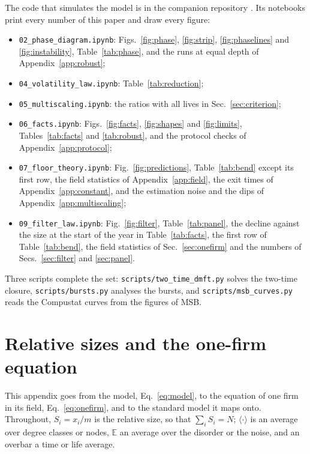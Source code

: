\documentclass[pre,twocolumn,superscriptaddress,nofootinbib]{revtex4-2}
\newcommand{\E}{\mathbb E}
\begin{document}
The code that simulates the model is in the companion repository \cite{code}.  Its notebooks print every
number of this paper and draw every figure:
\begin{itemize}
\item \texttt{02\_phase\_diagram.ipynb}: Figs.~\ref{fig:phase}, \ref{fig:strip}, \ref{fig:phaselines} and
  \ref{fig:instability}, Table~\ref{tab:phase}, and the runs at equal depth of Appendix~\ref{app:robust};
\item \texttt{04\_volatility\_law.ipynb}: Table~\ref{tab:reduction};
\item \texttt{05\_multiscaling.ipynb}: the ratios with all lives in Sec.~\ref{sec:criterion};
\item \texttt{06\_facts.ipynb}: Figs.~\ref{fig:facts}, \ref{fig:shapes} and \ref{fig:limits}, Tables~\ref{tab:facts} and \ref{tab:robust}, and the protocol checks of Appendix~\ref{app:protocol};
\item \texttt{07\_floor\_theory.ipynb}: Fig.~\ref{fig:predictions}, Table~\ref{tab:bend} except its first row, the field statistics of Appendix~\ref{app:field}, the exit times of
  Appendix~\ref{app:constant}, and the estimation noise and the dips of Appendix~\ref{app:multiscaling};
\item \texttt{09\_filter\_law.ipynb}: Fig.~\ref{fig:filter}, Table~\ref{tab:panel}, the decline against the size at
  the start of the year in Table~\ref{tab:facts}, the first row of Table~\ref{tab:bend}, the field statistics of Sec.~\ref{sec:onefirm} and the numbers of
  Secs.~\ref{sec:filter} and \ref{sec:panel}.
\end{itemize}
Three scripts complete the set: \texttt{scripts/two\_time\_dmft.py} solves the two-time closure,
\texttt{scripts/bursts.py} analyses the bursts, and \texttt{scripts/msb\_curves.py} reads the Compustat curves
from the figures of MSB.

\appendix

\section{Relative sizes and the one-firm equation}
\label{app:relative}

This appendix goes from the model, Eq.~\eqref{eq:model}, to the equation of one firm in its field,
Eq.~\eqref{eq:onefirm}, and to the standard model it maps onto.  Throughout, $S_i=x_i/m$ is the relative size, so that
$\sum_iS_i=N$; $\langle\cdot\rangle$ is an average over degree classes or nodes, $\E$ an average over the disorder or the
noise, and an overbar a time or life average.
\end{document}

